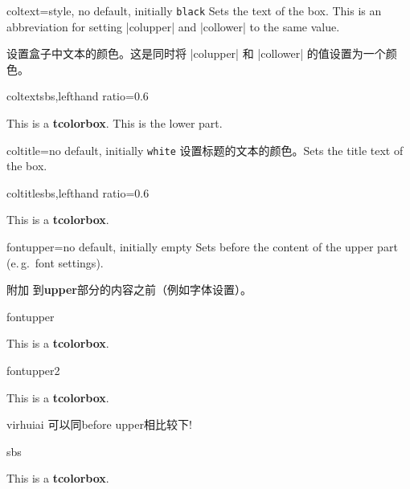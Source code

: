 \begin{docTcbKey}{coltext}{=}{style, no default, initially \texttt{black}}
Sets the text  of the box. This is an abbreviation for setting
|colupper| and |collower| to the same value.

设置盒子中文本的颜色。这是同时将 |colupper| 和 |collower| 的值设置为一个颜色。
\begin{exdispExample*}{coltext}{sbs,lefthand ratio=0.6}
\begin{tcolorbox}[coltext=red!75!black]
This is a \textbf{tcolorbox}.
\tcblower
This is the lower part.
\end{tcolorbox}
\end{exdispExample*}
\end{docTcbKey}


\begin{docTcbKey}{coltitle}{=}{no default, initially \texttt{white}}
设置标题的文本的颜色。\hfill Sets the title text  of the box.
\begin{exdispExample*}{coltitle}{sbs,lefthand ratio=0.6}
\begin{tcolorbox}[coltitle=red!75!black,
colbacktitle=black!10!white,title=Test]
This is a \textbf{tcolorbox}.
\end{tcolorbox}
\end{exdispExample*}
\end{docTcbKey}






\begin{docTcbKey}{fontupper}{=}{no default, initially empty}
Sets  before the content of the upper part (e.\,g.\ font settings).

附加  到{\bf upper}部分的内容之前（例如字体设置）。

\begin{exdispExample}{fontupper}
\begin{tcolorbox}[fontupper=Hello!~\sffamily]
This is a \textbf{tcolorbox}.
\end{tcolorbox}
\end{exdispExample}
\begin{exdispExample}{fontupper2}
\begin{tcolorbox}[fontupper=Hello!~]
This is a \textbf{tcolorbox}.
\end{tcolorbox}
\end{exdispExample}

\begin{引述之言}{virhuiai}
可以同before upper相比较下!
\end{引述之言}
\begin{dispExample*}{sbs}
\begin{tcolorbox}[fontupper={\sf Hello!~},before upper={\tt before upper~}]
This is a \textbf{tcolorbox}.
\end{tcolorbox}
\end{dispExample*}
\end{docTcbKey}




